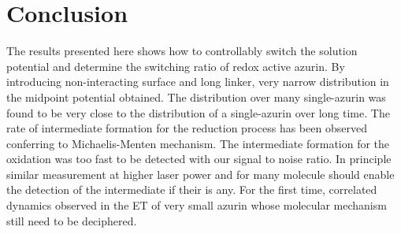 \documentclass[journal=jacsat,manuscript=article]{achemso}
\begin{document}
\section{Conclusion}
The results presented here shows how to controllably switch the solution potential and determine the switching ratio of redox active azurin.
By introducing non-interacting surface and long linker, very narrow distribution in the midpoint potential obtained.
The distribution over many single-azurin was found to be very close to the distribution of a single-azurin over long time.
The rate of intermediate formation for the reduction process has been observed conferring to Michaelis-Menten mechanism.
The intermediate formation for the oxidation was too fast to be detected with our signal to noise ratio.
In principle similar measurement at higher laser power and for many molecule should enable the detection of the intermediate if their is any.
For the first time, correlated dynamics observed in the ET of very small azurin whose molecular mechanism still need to be deciphered.

% 
\pagebreak

\end{document}
